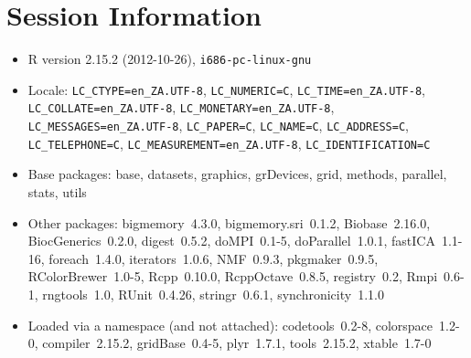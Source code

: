 \documentclass[10pt]{article}
\begin{document}
\section*{Session Information}
\begin{itemize}\raggedright
  \item R version 2.15.2 (2012-10-26), \verb|i686-pc-linux-gnu|
  \item Locale: \verb|LC_CTYPE=en_ZA.UTF-8|, \verb|LC_NUMERIC=C|, \verb|LC_TIME=en_ZA.UTF-8|, \verb|LC_COLLATE=en_ZA.UTF-8|, \verb|LC_MONETARY=en_ZA.UTF-8|, \verb|LC_MESSAGES=en_ZA.UTF-8|, \verb|LC_PAPER=C|, \verb|LC_NAME=C|, \verb|LC_ADDRESS=C|, \verb|LC_TELEPHONE=C|, \verb|LC_MEASUREMENT=en_ZA.UTF-8|, \verb|LC_IDENTIFICATION=C|
  \item Base packages: base, datasets, graphics, grDevices, grid,
    methods, parallel, stats, utils
  \item Other packages: bigmemory~4.3.0, bigmemory.sri~0.1.2,
    Biobase~2.16.0, BiocGenerics~0.2.0, digest~0.5.2, doMPI~0.1-5,
    doParallel~1.0.1, fastICA~1.1-16, foreach~1.4.0, iterators~1.0.6,
    NMF~0.9.3, pkgmaker~0.9.5, RColorBrewer~1.0-5, Rcpp~0.10.0,
    RcppOctave~0.8.5, registry~0.2, Rmpi~0.6-1, rngtools~1.0,
    RUnit~0.4.26, stringr~0.6.1, synchronicity~1.1.0
  \item Loaded via a namespace (and not attached): codetools~0.2-8,
    colorspace~1.2-0, compiler~2.15.2, gridBase~0.4-5, plyr~1.7.1,
    tools~2.15.2, xtable~1.7-0
\end{itemize}
\end{document}
